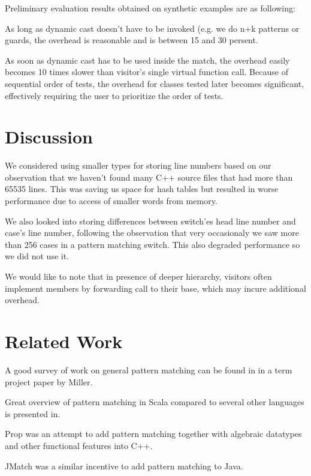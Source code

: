 \documentclass[preprint]{sigplanconf}
\begin{document}
Preliminary evaluation results obtained on synthetic examples are as following:

As long as dynamic cast doesn't have to be invoked (e.g. we do n+k patterns or 
guards, the overhead is reasonable and is between 15 and 30 persent.

As soon as dynamic cast has to be used inside the match, the overhead easily 
becomes 10 times slower than visitor's single virtual function call. Because of 
sequential order of tests, the overhead for classes tested later becomes 
significant, effectively requiring the user to prioritize the order of tests.

\section{Discussion} %

We considered using smaller types for storing line numbers based on our 
observation that we haven't found many C++ source files that had more than 65535 
lines. This was saving us space for hash tables but resulted in worse 
performance due to access of smaller words from memory.

We also looked into storing differences between switch'es head line number and 
case's line number, following the observation that very occasionaly we saw more 
than 256 cases in a pattern matching switch. This also degraded performance so 
we did not use it.

We would like to note that in presence of deeper hierarchy, visitors often 
implement members by forwarding call to their base, which may incure additional 
overhead.

\section{Related Work} %
\label{sec:rw}

A good survey of work on general pattern matching can be found in in a term 
project paper by Miller\cite{Miller10}.

Great overview of pattern matching in Scala compared to several other languages 
is presented in\cite{ScalaPM}.

Prop was an attempt to add pattern matching together with algebraic datatypes 
and other functional features into C++\cite{Prop96}.

JMatch was a similar incentive to add pattern matching to Java.
\end{document}
